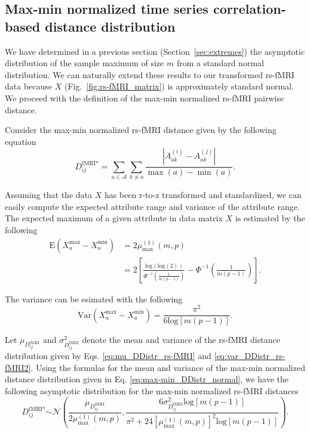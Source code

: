 \documentclass[aoas]{imsart}
\begin{document}
\subsection{Max-min normalized time series correlation-based distance distribution}

We have determined in a previous section (Section~\ref{sec:extremes}) the asymptotic distribution of the sample maximum of size $m$ from a standard normal distribution. We can naturally extend these results to our transformed rs-fMRI data because $X$ (Fig.~\ref{fig:rs-fMRI_matrix}) is approximately standard normal. We proceed with the definition of the max-min normalized rs-fMRI pairwise distance.

Consider the max-min normalized rs-fMRI distance given by the following equation
%
\begin{equation}\label{eq:max-min_diff_rs-fMRI}
D^\text{fMRI*}_{ij} = \sum_{a \in \mathcal{A}} \sum_{k \neq a} \frac{\left|A^{(i)}_{ak} - A^{(j)}_{ak}\right|}{\max(a) - \min(a)}.
\end{equation}

Assuming that the data $X$ has been r-to-z transformed and standardized, we can easily compute the expected attribute range and variance of the attribute range. The expected maximum of a given attribute in data matrix $X$ is estimated by the following
%
\begin{equation}\label{eq:mean_max_rs-fMRI}
\begin{aligned}
\text{E}\left(X^\text{max}_a - X^\text{min}_a\right) &= 2\mu^{(1)}_\text{max}(m,p) \\
&= 2 \left[\frac{\text{log}(\text{log}(2))}{\Phi^{-1}\left(\frac{1}{m(p-1)}\right)} - \Phi^{-1}\left(\frac{1}{m(p-1)}\right)\right].
\end{aligned}
\end{equation}

The variance can be esimated with the following
%
\begin{equation}\label{eq:var_max_rs-fMRI}
\text{Var}\left(X^\text{max}_a - X^\text{min}_a\right) = \frac{\pi^2}{6\text{log}[m(p-1)]}.
\end{equation}

Let $\mu_{D^\text{fMRI}_{ij}}$ and $\sigma^2_{D^\text{fMRI}_{ij}}$ denote the mean and variance of the rs-fMRI distance distribution given by Eqs. \ref{eq:mu_DDistr_rs-fMRI} and \ref{eq:var_DDistr_rs-fMRI2}. Using the formulas for the mean and variance of the max-min normalized distance distribution given in Eq. \ref{eq:max-min_DDistr_normal}, we have the following asymptotic distribution for the max-min normalized rs-fMRI distances
%
\begin{equation}\label{eq:max-min_DDistr_normal_rs-fMRI}
D^\text{fMRI*}_{ij} \overset{.}{\sim} \mathcal{N}\left(\frac{\mu_{D^\text{fMRI}_{ij}}}{2\mu^{(1)}_\text{max}(m,p)}, \frac{6\sigma^2_{D^\text{fMRI}_{ij}}\text{log}[m(p-1)]}{\pi^2 + 24\left[\mu^{(1)}_\text{max}(m,p)\right]^2\text{log}[m(p-1)]}\right).
\end{equation}
\end{document}
